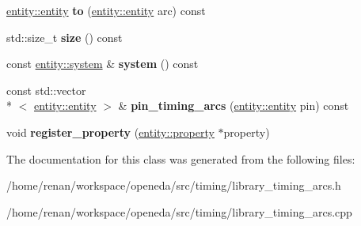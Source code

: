 \begin{DoxyCompactItemize}
\item 
\hypertarget{classophidian_1_1timing_1_1library__timing__arcs_adf5bcd7946f381e7b0b437e296379295}{\hyperlink{classophidian_1_1entity_1_1entity}{entity\-::entity} {\bfseries to} (\hyperlink{classophidian_1_1entity_1_1entity}{entity\-::entity} arc) const }\label{classophidian_1_1timing_1_1library__timing__arcs_adf5bcd7946f381e7b0b437e296379295}

\item 
\hypertarget{classophidian_1_1timing_1_1library__timing__arcs_a32593c010255c8a6c731119eafd8e1ad}{std\-::size\-\_\-t {\bfseries size} () const }\label{classophidian_1_1timing_1_1library__timing__arcs_a32593c010255c8a6c731119eafd8e1ad}

\item 
\hypertarget{classophidian_1_1timing_1_1library__timing__arcs_afb8f1a8a4d4b6e84a7402e9a0b22569a}{const \hyperlink{classophidian_1_1entity_1_1system}{entity\-::system} \& {\bfseries system} () const }\label{classophidian_1_1timing_1_1library__timing__arcs_afb8f1a8a4d4b6e84a7402e9a0b22569a}

\item 
\hypertarget{classophidian_1_1timing_1_1library__timing__arcs_a067232d44b79e2fd03e236f3dcdfedf8}{const std\-::vector\\*
$<$ \hyperlink{classophidian_1_1entity_1_1entity}{entity\-::entity} $>$ \& {\bfseries pin\-\_\-timing\-\_\-arcs} (\hyperlink{classophidian_1_1entity_1_1entity}{entity\-::entity} pin) const }\label{classophidian_1_1timing_1_1library__timing__arcs_a067232d44b79e2fd03e236f3dcdfedf8}

\item 
\hypertarget{classophidian_1_1timing_1_1library__timing__arcs_a8d5d9530864dacf0c2b4a0a43332574f}{void {\bfseries register\-\_\-property} (\hyperlink{classophidian_1_1entity_1_1property}{entity\-::property} $\ast$property)}\label{classophidian_1_1timing_1_1library__timing__arcs_a8d5d9530864dacf0c2b4a0a43332574f}

\end{DoxyCompactItemize}


The documentation for this class was generated from the following files\-:\begin{DoxyCompactItemize}
\item 
/home/renan/workspace/openeda/src/timing/library\-\_\-timing\-\_\-arcs.\-h\item 
/home/renan/workspace/openeda/src/timing/library\-\_\-timing\-\_\-arcs.\-cpp\end{DoxyCompactItemize}

